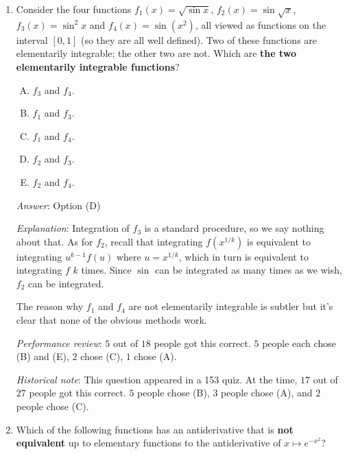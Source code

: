 \documentclass[10pt]{amsart}
\begin{document}
\begin{enumerate}
  {\em Performance review}: $8$ out of $18$ people got this
  correct. $8$ people chose (E) and $2$ people chose (D).

  {\em Historical note}: This question appeared in a 153 quiz. At
  the time, $22$ out of $27$ people got this correct. $4$ people chose
  (E), and $1$ person chose (D).

\item Consider the four functions $f_1(x) = \sqrt{\sin x}$, $f_2(x) =
  \sin \sqrt{x}$, $f_3(x) = \sin^2 x$ and $f_4(x) = \sin(x^2)$, all
  viewed as functions on the interval $[0,1]$ (so they are all well
  defined). Two of these functions are elementarily integrable; the
  other two are not. Which are {\bf the two elementarily integrable
  functions}?

  \begin{enumerate}[(A)]
  \item $f_3$ and $f_4$.
  \item $f_1$ and $f_3$.
  \item $f_1$ and $f_4$. 
  \item $f_2$ and $f_3$.
  \item $f_2$ and $f_4$.
  \end{enumerate}

  {\em Answer}: Option (D)

  {\em Explanation}: Integration of $f_3$ is a standard procedure, so
  we say nothing about that. As for $f_2$, recall that integrating
  $f(x^{1/k})$ is equivalent to integrating $u^{k-1}f(u)$ where $u =
  x^{1/k}$, which in turn is equivalent to integrating $f$ $k$
  times. Since $\sin$ can be integrated as many times as we wish,
  $f_2$ can be integrated.

  The reason why $f_1$ and $f_4$ are not elementarily integrable is
  subtler but it's clear that none of the obvious methods work.

  {\em Performance review}: $5$ out of $18$ people got this
  correct. $5$ people each chose (B) and (E), $2$ chose (C), $1$ chose
  (A).

  {\em Historical note}: This question appeared in a 153 quiz. At the
  time, $17$ out of $27$ people got this correct. $5$ people chose (B),
  $3$ people chose (A), and $2$ people chose (C).

\item Which of the following functions has an antiderivative that is
  {\bf not equivalent} up to elementary functions to the antiderivative of
  $x \mapsto e^{-x^2}$?


\end{enumerate}
\end{document}
